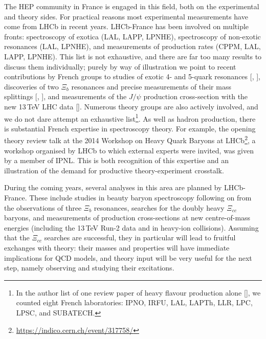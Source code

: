 The HEP community in France is engaged in this field, both on
the experimental and theory sides. For practical reasons most
experimental measurements have come from LHCb in recent years.
LHCb-France has been involved on multiple fronts:
spectroscopy of exotica (LAL, LAPP, LPNHE),
spectroscopy of non-exotic resonances (LAL, LPNHE),
and measurements of production rates (CPPM, LAL, LAPP, LPNHE).
This list is not exhaustive, and there are far too many
results to discuss them individually; purely by way of
illustration we point to recent contributions by French groups to
%
studies of exotic 4- and 5-quark resonances
[\cite{Aaij:2016ymb}, \cite{Aaij:2014jqa}],
%
discoveries of two $\Xi_b$ resonances and precise measurements
of their mass splittings [\cite{Aaij:2016jnn}, \cite{Aaij:2014yka}],
%
and measurements of the $J/\psi$ production cross-section
with the new 13\,TeV LHC data
[\cite{Aaij:2015rla}].
Numerous theory groups are also actively involved, and
we do not dare attempt an exhaustive list\footnote{
  In the author list of one review paper of heavy flavour
  production alone [\cite{Andronic:2015wma}],
  we counted eight French laboratories:
  IPNO, IRFU, LAL, LAPTh, LLR, LPC, LPSC, and SUBATECH.
}.
As well as hadron production, there is substantial French
expertise in spectroscopy theory. For example, the opening
theory review talk at the 
2014 Workshop on Heavy Quark Baryons at LHCb\footnote{
  \url{https://indico.cern.ch/event/317758/}
}, a workshop organised by LHCb to which external experts were invited,
was given by a member of IPNL. This is both recognition of
this expertise and an illustration of the demand for
productive theory-experiment crosstalk.

%



During the coming years, several analyses in this area are
planned by LHCb-France. These include studies in
beauty baryon spectroscopy following on from the observations
of three $\Xi_b$ resonances, searches for the doubly heavy
$\Xi_{cc}$ baryons, and measurements of production cross-sections
at new centre-of-mass energies (including the 13\,TeV Run-2
data and in heavy-ion collisions). Assuming that the $\Xi_{cc}$
searches are successful, they in particular will lead to fruitful
exchanges with theory: their masses and properties will have
immediate implications for QCD models, and theory input will be
very useful for the next step, namely observing and studying their
excitations.

